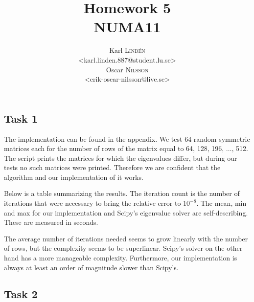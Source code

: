 \documentclass[a4paper,12pt]{article}
\begin{document}
\title{Homework 5 \\ NUMA11}
\author{
  Karl \textsc{Lind\'{e}n} \\
  <karl.linden.887@student.lu.se> \\
  Oscar \textsc{Nilsson} \\
  <erik-oscar-nilsson@live.se>
}

\maketitle
\thispagestyle{empty}

\newpage


\subsection*{Task 1}

The implementation can be found in the appendix.
We test 64 random symmetric matrices each for the number of rows of the matrix
equal to 64, 128, 196, \(\dots\), 512.
The script prints the matrices for which the eigenvalues differ, but during our
tests no such matrices were printed.
Therefore we are confident that the algorithm and our implementation of it
works.

Below is a table summarizing the results.
The iteration count is the number of iterations that were necessary to bring the
relative error to \(10^{-8}\).
The mean, min and max for our implementation and Scipy's eigenvalue solver are
self-describing.
These are measured in seconds.

The average number of iterations needed seems to grow linearly with the number
of rows, but the complexity seems to be superlinear.
Scipy's solver on the other hand has a more manageable complexity.
Furthermore, our implementation is always at least an order of magnitude slower
than Scipy's.

\begin{landscape}
  
\end{landscape}


\subsection*{Task 2}
\end{document}
